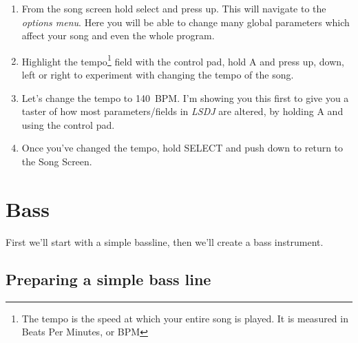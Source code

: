 \documentclass[]{article}
\newcommand{\buttonStyle}[1]{\textsf{#1}\xspace}
\newcommand{\bA}{\buttonStyle{A}}
\newcommand{\bSelect}{\buttonStyle{{SELECT}}}
\newcommand{\bRight}{\buttonStyle{right}}
\newcommand{\bLeft}{\buttonStyle{left}}
\newcommand{\bUp}{\buttonStyle{up}}
\newcommand{\bDown}{\buttonStyle{down}}
\newcommand{\lsdj}{\textit{LSDJ}\xspace}
\begin{document}

\begin{enumerate}



\item From the song screen hold select and press up. This will navigate to the \textit{options menu}. Here you will be able to change many global parameters which affect your song and even the whole program.

\item Highlight the tempo\footnote{The tempo is the speed at which your entire song is played. It is measured in Beats Per Minutes, or BPM} field with the control pad, hold \bA and press \bUp, \bDown, \bLeft or \bRight to experiment with changing the tempo of the song.

\item Let's change the tempo to 140~BPM. I'm showing you this first to give you a taster of how most parameters/fields in \lsdj are altered, by holding \bA and using the control pad.

\item Once you've changed the tempo, hold \bSelect and push \bDown to return to the Song Screen.
\end{enumerate}

\section{Bass}

First we'll start with a simple bassline, then we'll create a bass instrument.

\subsection{Preparing a simple bass line}
\end{document}
